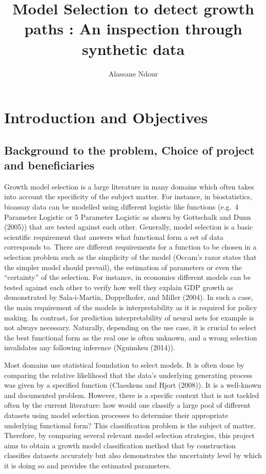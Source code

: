 \documentclass[]{article}
\title{Model Selection to detect growth paths : An inspection through synthetic
data}
\author{Alassane Ndour}
\date{}
\begin{document}
\maketitle

\hypertarget{introduction-and-objectives}{%
\section{Introduction and
Objectives}\label{introduction-and-objectives}}

\hypertarget{background-to-the-problem-choice-of-project-and-beneficiaries}{%
\subsection{Background to the problem, Choice of project and
beneficiaries}\label{background-to-the-problem-choice-of-project-and-beneficiaries}}

Growth model selection is a large literature in many domains which often
takes into account the specificity of the subject matter. For instance,
in biostatistics, bioassay data can be modelled using different logistic
like functions (e.g.~4 Parameter Logistic or 5 Parameter Logistic as
shown by Gottschalk and Dunn (2005)) that are tested against each other.
Generally, model selection is a basic scientific requirement that
answers what functional form a set of data corresponds to. There are
different requirements for a function to be chosen in a selection
problem such as the simplicity of the model (Occam's razor states that
the simpler model should prevail), the estimation of parameters or even
the ``certainty'' of the selection. For instance, in economics different
models can be tested against each other to verify how well they explain
GDP growth as demonstrated by Sala-i-Martin, Doppelhofer, and Miller
(2004). In such a case, the main requirement of the models is
interpretability as it is required for policy making. In contrast, for
prediction interpretability of neural nets for example is not always
necessary. Naturally, depending on the use case, it is crucial to select
the best functional form as the real one is often unknown, and a wrong
selection invalidates any following inference (Nguimkeu (2014)).

Most domains use statistical foundation to select models. It is often
done by comparing the relative likelihood that the data's underlying
generating process was given by a specified function (Claeskens and
Hjort (2008)). It is a well-known and documented problem. However, there
is a specific context that is not tackled often by the current
literature: how would one classify a large pool of different datasets
using model selection processes to determine their appropriate
underlying functional form? This classification problem is the subject
of matter. Therefore, by comparing several relevant model selection
strategies, this project aims to obtain a growth model classification
method that by construction classifies datasets accurately but also
demonstrates the uncertainty level by which it is doing so and provides
the estimated parameters.
\end{document}
